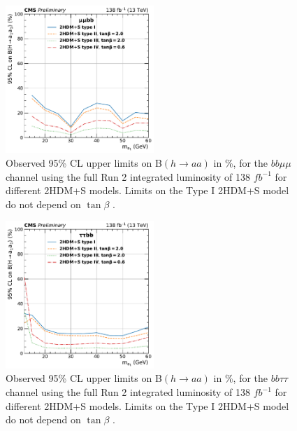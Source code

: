 \begin{figure}[ht]
    \begin{center}
      \includegraphics[width=0.5\textwidth]{figures/ch-10-results/HAA_bbmm_all_prelim.pdf}
    \end{center}
    \caption[Observed 95\% CL upper limits on B$(h \rightarrow aa)$ in \%, for the $bb\mu\mu$ channel using the full Run 2 integrated luminosity of 138 $fb^{-1}$ for different 2HDM+S models.]{Observed 95\% CL upper limits on B$(h \rightarrow aa)$ in \%, for the $bb\mu\mu$ channel using the full Run 2 integrated luminosity of 138 $fb^{-1}$ for different 2HDM+S models. Limits on the Type I 2HDM+S model do not depend on $\tan\beta$ \cite{CMS-AN-20-213}.}
      \label{fig:results_limits_mmbb}
  \end{figure}
  \begin{figure}[h!]
    \begin{center}
      \includegraphics[width=0.5\textwidth]{figures/ch-10-results/HAA_bbtt_all_prelim.pdf}
    \end{center}
    \caption[Observed 95\% CL upper limits on B$(h \rightarrow aa)$ in \%, for the $bb\tau\tau$ channel using the full Run 2 integrated luminosity of 138 $fb^{-1}$ for different 2HDM+S models.]{Observed 95\% CL upper limits on B$(h \rightarrow aa)$ in \%, for the $bb\tau\tau$ channel using the full Run 2 integrated luminosity of 138 $fb^{-1}$ for different 2HDM+S models. Limits on the Type I 2HDM+S model do not depend on $\tan\beta$ \cite{CMS-AN-20-213}.}
      \label{fig:results_limits_ttbb}
  \end{figure}
